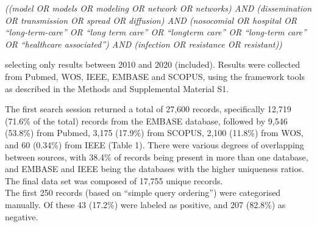 \documentclass{article}
\begin{document}
\emph{((model OR models OR modeling OR network OR networks) AND
(dissemination OR transmission OR spread OR diffusion) AND (nosocomial
OR hospital OR ``long-term-care'' OR ``long term care'' OR ``longterm
care'' OR ``long-term care'' OR ``healthcare associated'') AND
(infection OR resistance OR resistant))}

selecting only results between 2010 and 2020 (included). Results were
collected from Pubmed, WOS, IEEE, EMBASE and SCOPUS, using the framework
tools as described in the Methods and Supplemental Material S1.

The first search session returned a total of 27,600 records,
specifically 12,719 (71.6\% of the total) records from the EMBASE
database, followed by 9,546 (53.8\%) from Pubmed, 3,175 (17.9\%) from
SCOPUS, 2,100 (11.8\%) from WOS, and 60 (0.34\%) from IEEE (Table 1).
There were various degrees of overlapping between sources, with 38.4\%
of records being present in more than one database, and EMBASE and IEEE
being the databases with the higher uniqueness ratios. The final data
set was composed of 17,755 unique records.\\
The first 250 records (based on ``simple query ordering'') were
categorised manually. Of these 43 (17.2\%) were labeled as positive, and
207 (82.8\%) as negative.
\end{document}
